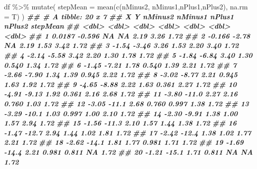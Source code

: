 \documentclass[
]{book}
\newenvironment{Shaded}{\begin{snugshade}}{\end{snugshade}}
\newcommand{\AttributeTok}[1]{\textcolor[rgb]{0.77,0.63,0.00}{#1}}
\newcommand{\DocumentationTok}[1]{\textcolor[rgb]{0.56,0.35,0.01}{\textbf{\textit{#1}}}}
\newcommand{\FunctionTok}[1]{\textcolor[rgb]{0.00,0.00,0.00}{#1}}
\newcommand{\NormalTok}[1]{#1}
\newcommand{\SpecialCharTok}[1]{\textcolor[rgb]{0.00,0.00,0.00}{#1}}
\begin{document}
\begin{Shaded}
\begin{Highlighting}[]
\NormalTok{df }\SpecialCharTok{\%\textgreater{}\%}
  \FunctionTok{mutate}\NormalTok{(}
    \AttributeTok{stepMean =} \FunctionTok{mean}\NormalTok{(}\FunctionTok{c}\NormalTok{(nMinus2, nMinus1,nPlus1,nPlus2), }\AttributeTok{na.rm =}\NormalTok{ T)}
\NormalTok{  )}
\DocumentationTok{\#\# \# A tibble: 20 x 7}
\DocumentationTok{\#\#          X       Y nMinus2 nMinus1 nPlus1 nPlus2 stepMean}
\DocumentationTok{\#\#      \textless{}dbl\textgreater{}   \textless{}dbl\textgreater{}   \textless{}dbl\textgreater{}   \textless{}dbl\textgreater{}  \textless{}dbl\textgreater{}  \textless{}dbl\textgreater{}    \textless{}dbl\textgreater{}}
\DocumentationTok{\#\#  1  0.0187  {-}0.596   NA     NA      2.19    3.26     1.72}
\DocumentationTok{\#\#  2 {-}0.166   {-}2.78    NA      2.19   1.53    3.42     1.72}
\DocumentationTok{\#\#  3 {-}1.54    {-}3.46     3.26   1.53   2.20    3.40     1.72}
\DocumentationTok{\#\#  4 {-}2.14    {-}5.58     3.42   2.20   1.30    1.78     1.72}
\DocumentationTok{\#\#  5 {-}1.84    {-}6.84     3.40   1.30   0.540   1.34     1.72}
\DocumentationTok{\#\#  6 {-}1.45    {-}7.21     1.78   0.540  1.39    2.21     1.72}
\DocumentationTok{\#\#  7 {-}2.66    {-}7.90     1.34   1.39   0.945   2.22     1.72}
\DocumentationTok{\#\#  8 {-}3.02    {-}8.77     2.21   0.945  1.63    1.92     1.72}
\DocumentationTok{\#\#  9 {-}4.65    {-}8.88     2.22   1.63   0.361   2.27     1.72}
\DocumentationTok{\#\# 10 {-}4.91    {-}9.13     1.92   0.361  2.16    2.68     1.72}
\DocumentationTok{\#\# 11 {-}3.80   {-}11.0      2.27   2.16   0.760   1.03     1.72}
\DocumentationTok{\#\# 12 {-}3.05   {-}11.1      2.68   0.760  0.997   1.38     1.72}
\DocumentationTok{\#\# 13 {-}3.29   {-}10.1      1.03   0.997  1.00    2.10     1.72}
\DocumentationTok{\#\# 14 {-}2.30    {-}9.91     1.38   1.00   1.57    2.94     1.72}
\DocumentationTok{\#\# 15 {-}1.56   {-}11.3      2.10   1.57   1.44    1.38     1.72}
\DocumentationTok{\#\# 16 {-}1.47   {-}12.7      2.94   1.44   1.02    1.81     1.72}
\DocumentationTok{\#\# 17 {-}2.42   {-}12.4      1.38   1.02   1.77    2.21     1.72}
\DocumentationTok{\#\# 18 {-}2.62   {-}14.1      1.81   1.77   0.981   1.71     1.72}
\DocumentationTok{\#\# 19 {-}1.69   {-}14.4      2.21   0.981  0.811  NA        1.72}
\DocumentationTok{\#\# 20 {-}1.21   {-}15.1      1.71   0.811 NA      NA        1.72}
\end{Highlighting}
\end{Shaded}
\end{document}
